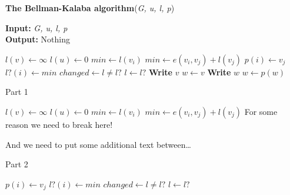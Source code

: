 \documentclass[letter,12pt]{article}
\begin{document}
\begin{algorithm}
\caption{{\bf The Bellman-Kalaba algorithm}({\it G, u, l, p})}
{\textbf{Input:} {\it G, u, l, p}} \\
{\textbf{Output:} Nothing}
\begin{algorithmic}[1]

		\State $l(v) \leftarrow \infty$
	\EndFor
	\State $l(u) \leftarrow 0$
	\Repeat
		\State $min \leftarrow l(v_i)$
					\State $min \leftarrow e(v_i, v_j) + l(v_j)$
					\State $p(i) \leftarrow v_j$
				\EndIf
			\EndFor
			\State $l?(i) \leftarrow min$
		\EndFor
		\State $changed \leftarrow l \not= l?$
		\State $l \leftarrow l?$
\EndProcedure
\Statex
{}
		\State \textbf{Write} $v$
	\Else
		\State $w \leftarrow v$
			\State \textbf{Write} $w$
			\State $w \leftarrow p(w)$
		\EndWhile
	\EndIf
\EndProcedure
\end{algorithmic}
\end{algorithm}


\newpage





\begin{algorithm}
\caption{Part 1}
\begin{algorithmic}[1]
		\State $l(v) \leftarrow \infty$
	\EndFor
	\State $l(u) \leftarrow 0$
	\Repeat
			\State $min \leftarrow l(v_i)$
					\State $min \leftarrow e(v_i, v_j) + l(v_j)$
					\State \Comment For some reason we need to break here!
\end{algorithmic}
\end{algorithm}

And we need to put some additional text between\dots


\begin{algorithm}[h]
\caption{Part 2}
\begin{algorithmic}[1]
						\State $p(i) \leftarrow v_j$
					\EndIf
				\EndFor
			\State $l?(i) \leftarrow min$
		\EndFor
		\State $changed \leftarrow l \not= l?$
		\State $l \leftarrow l?$
\EndProcedure
\end{algorithmic}
\end{algorithm}
\end{document}
